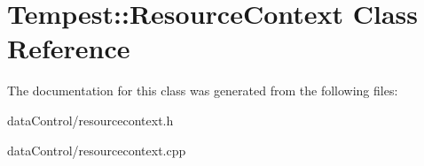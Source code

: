 \hypertarget{class_tempest_1_1_resource_context}{\section{Tempest\+:\+:Resource\+Context Class Reference}
\label{class_tempest_1_1_resource_context}
}


The documentation for this class was generated from the following files\+:\begin{DoxyCompactItemize}
\item 
data\+Control/resourcecontext.\+h\item 
data\+Control/resourcecontext.\+cpp\end{DoxyCompactItemize}
